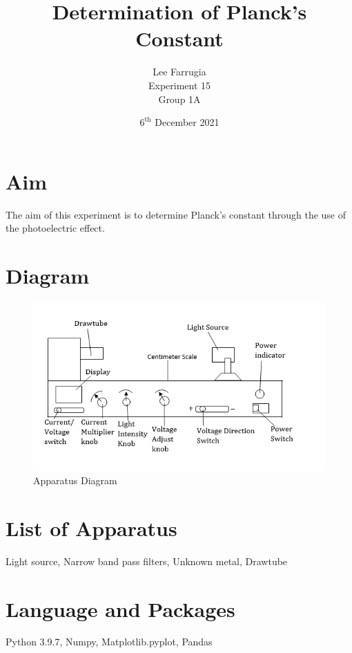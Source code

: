 \documentclass[12pt, a4paper]{article}
\title{Determination of Planck's Constant}
\author{Lee Farrugia \\ Experiment 15 \\ Group 1A}
\date{$6^{\text{th}}$ December 2021}
\begin{document}
\maketitle

\section*{Aim}
The aim of this experiment is to determine Planck's constant through the use of the photoelectric effect. 

\section*{Diagram}
\begin{figure}[H]
    \centering
    \includegraphics{Experiment 15 Diagram.png}
    \caption{Apparatus Diagram}
    \label{fig:Diagram}
\end{figure}

\section*{List of Apparatus}
Light source, Narrow band pass filters, Unknown metal, Drawtube

\section*{Language and Packages}
Python 3.9.7, Numpy, Matplotlib.pyplot, Pandas
\end{document}
